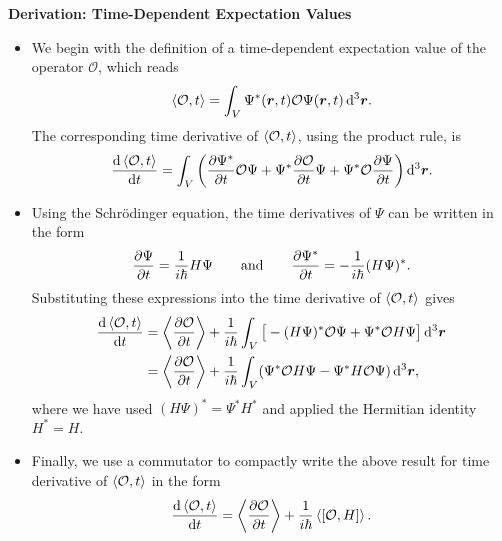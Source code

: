 \documentclass[11pt, a4paper]{article}
\newcommand{\diff}{\mathop{}\!\mathrm{d}} %
\newcommand{\dr}{\diff^{3} \r}  %
\newcommand{\eqtext}[1]{\qquad \text{#1} \qquad}
\newcommand{\Schro}{Schr\"{o}dinger\xspace}
\renewcommand{\vec}[1]{\bm{#1}}  %
\renewcommand{\r}{\vec{r}}  %
\renewcommand{\O}{\mathcal{O}}  %
\renewcommand{\P}{\Psi}  %
\begin{document}
\textbf{Derivation: Time-Dependent Expectation Values}
\begin{itemize}
	\item We begin with the definition of a time-dependent expectation value of the operator $ \O $, which reads
	\begin{equation*}
		\ev{\O, t} = \int_{V} \P^{*}(\r, t) \O \P(\r, t) \dr.
	\end{equation*}
	The corresponding time derivative of $ \ev{\O, t} $, using the product rule, is
	\begin{equation*}
		\dv{\ev{\O, t}}{t} = \int_{V} \left(\pdv{\P^{*}}{t} \O \P + \P^{*}\pdv{\O}{t}\P + \P^{*}\O \pdv{\P}{t}\right) \dr.
	\end{equation*}

	\item Using the \Schro equation, the time derivatives of $ \P $ can be written in the form
	\begin{equation*}
		\pdv{\P}{t} = \frac{1}{i\hbar}H \P \eqtext{and} \pdv{\P^{*}}{t} = -\frac{1}{i\hbar}(H \P)^{*}.
	\end{equation*}
	Substituting these expressions into the time derivative of $ \ev{\O, t} $ gives
	\begin{align*}
		\dv{\ev{\O, t}}{t} &= \ev{\pdv{\O}{t}} + \frac{1}{i \hbar} \int_{V} \big[- (H\P)^{*}\O \P + \P^{*}\O H \P \big] \dr\\
		& = \ev{\pdv{\O}{t}} + \frac{1}{i \hbar} \int_{V} (\P^{*}\O H \P - \P^{*}H \O \P) \dr,
	\end{align*}
	where we have used $ (H \P)^{*} = \P^{*}H^{*} $ and applied the Hermitian identity $ H^{*} = H $. 
	
	\item Finally, we use a commutator to compactly write the above result for time derivative of $ \ev{\O, t} $ in the form
	\begin{equation*}
		\dv{\ev{\O, t}}{t} =  \ev{\pdv{\O}{t}} + \frac{1}{i\hbar}\ev{[\O, H]}.
	\end{equation*}
\end{itemize}
\end{document}
